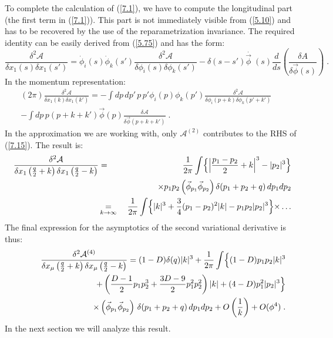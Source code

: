 \documentclass[a4paper,12pt]{article}
\numberwithin{equation}{section}
\newcommand{\dvp}{\dot{\vec{\phi}\;}\!}
\begin{document}
To complete the calculation of (\ref{7.1}), we have to compute the longitudinal
part (the first term in (\ref{7.1})). This part is not immediately visible
from (\ref{5.10}) and has to be recovered by the use of the reparametrization
invariance. The required identity can be easily derived from (\ref{5.75}) and
has the form:
\[
\frac{\delta ^{2}\mathcal{A}}{\delta x_{1}(s)\delta x_{1}(s')}=\dot{\phi }_{i}(s)\dot{\phi }_{k}(s')\frac{\delta ^{2}\mathcal{A}}{\delta \phi _{i}(s)\delta \phi _{k}(s')}-\delta (s-s')\dvp (s)\frac{d}{ds}\left( \frac{\delta A}{\delta \vec{\phi }(s)}\right) \; .\]
 In the momentum representation:
\begin{eqnarray}
(2\pi )\frac{\delta ^{2}\mathcal{A}}{\delta x_{1}\left( k\right) \delta x_{1}\left( k'\right) }=-\int dp\, dp'\, p\, p'\phi _{i}(p)\phi _{k}(p')\frac{\delta ^{2}\mathcal{A}}{\delta \phi _{i}(p+k)\delta \phi _{k}(p'+k')} &  & \nonumber \\
-\int dp\, p(p+k+k')\vec{\phi }(p)\frac{\delta \mathcal{A}}{\delta \vec{\phi }(p+k+k')}\; . &  & \label{7.15} 
\end{eqnarray}
 In the approximation we are working with, only \( \mathcal{A}^{(2)} \) contributes
to the RHS of (\ref{7.15}). The result is:
\begin{eqnarray}
\frac{\delta ^{2}\mathcal{A}}{\delta x_{1}\left( \frac{q}{2}+k\right) \delta x_{1}\left( \frac{q}{2}-k\right) } & = & \frac{1}{2\pi }\int\limits \Bigl \{\Bigl |\frac{p_{1}-p_{2}}{2}+k\Bigr |^{3}-|p_{2}|^{3}\Bigl \}\nonumber \\
 &  & \qquad \qquad \times p_{1}p_{2}\left( \vec{\phi }_{p_{1}}\vec{\phi }_{p_{2}}\right) \delta (p_{1}+p_{2}+q)\, dp_{1}dp_{2}\nonumber \\
 & \mathop {=}_{k\to \infty } & \frac{1}{2\pi }\int \Bigl \{|k|^{3}+\frac{3}{4}(p_{1}-p_{2})^{2}|k|-p_{1}p_{2}|p_{2}|^{3}\Bigl \}\times \ldots \label{7.16} 
\end{eqnarray}
 The final expression for the asymptotics of the second variational derivative
is thus:
\begin{eqnarray}
 &  & \frac{\delta ^{2}\mathcal{A}^{(4)}}{\delta x_{\mu }\left( \frac{q}{2}+k\right) \delta x_{\mu }\left( \frac{q}{2}-k\right) }=(1-D)\delta (q)|k|^{3}+\frac{1}{2\pi }\int \Bigl \{(1-D)p_{1}p_{2}|k|^{3}\nonumber \\
 &  & \qquad \qquad +\left( \frac{D-1}{2}p_{1}p_{2}^{3}+\frac{3D-9}{2}p_{1}^{2}p_{2}^{2}\right) |k|+(4-D)p_{1}^{2}|p_{2}|^{3}\Bigl \}\nonumber \\
 &  & \qquad \qquad \qquad \qquad \times \left( \vec{\phi }_{p_{1}}\vec{\phi }_{p_{2}}\right) \, \delta (p_{1}+p_{2}+q)\, dp_{1}dp_{2}+O\left( \frac{1}{k}\right) +O(\phi ^{4})\; .\label{7.17} 
\end{eqnarray}
 In the next section we will analyze this result.
\end{document}
